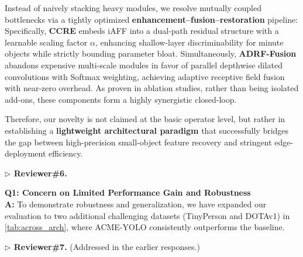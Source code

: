 \documentclass[10pt,twocolumn,letterpaper]{article}
\begin{document}
\noindent Instead of naively stacking heavy modules, we resolve mutually coupled bottlenecks via a tightly optimized \textbf{enhancement--fusion--restoration} pipeline:
\noindent Specifically, \textbf{CCRE} embeds iAFF into a dual-path residual structure with a learnable scaling factor $\alpha$, enhancing shallow-layer discriminability for minute objects while strictly bounding parameter bloat. Simultaneously, \textbf{ADRF-Fusion} abandons expensive multi-scale modules in favor of parallel depthwise dilated convolutions with Softmax weighting, achieving adaptive receptive field fusion with near-zero overhead. As proven in ablation studies, rather than being isolated add-ons, these components form a highly synergistic closed-loop.

\noindent Therefore, our novelty is not claimed at the basic operator level, but rather in establishing a \textbf{lightweight architectural paradigm} that successfully bridges the gap between high-precision small-object feature recovery and stringent edge-deployment efficiency.

\vspace{0.5em}
\noindent\textcolor{rev6color}{\textbf{$\triangleright$ Reviewer\#6.}}

\noindent\textbf{Q1: Concern on Limited Performance Gain and Robustness}\\
\noindent\textbf{A:} To demonstrate robustness and generalization, we have expanded our evaluation to two additional challenging datasets (TinyPerson and DOTAv1) in \cref{tab:across_arch}, where ACME-YOLO consistently outperforms the baseline.

\vspace{0.5em}

\noindent\textcolor{rev7color}{\textbf{$\triangleright$ Reviewer\#7.}}
\noindent (Addressed in the earlier responses.)
\end{document}
